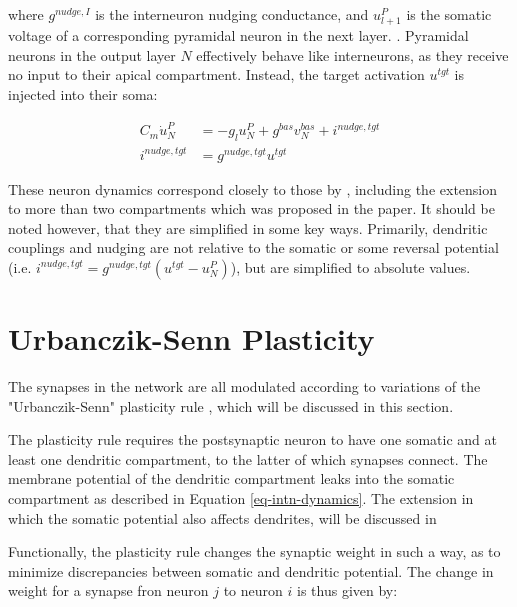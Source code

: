 where $ g^{nudge, I}$ is the interneuron nudging conductance, and $u_{l+1}^P$ is the somatic voltage of a corresponding
pyramidal neuron in the next layer. . Pyramidal neurons
in the output layer $N$ effectively behave like interneurons, as they receive no input to their apical compartment. Instead,
the target  activation $u^{tgt}$ is injected into their soma:

\begin{align}
  C_m \dot{u}_N^P & = - g_l u_N^{P} + g^{bas} v_N^{bas} + i^{nudge, tgt} \\
  i^{nudge, tgt}  & = g^{nudge, tgt} u^{tgt}
\end{align}


These neuron dynamics correspond closely to those by \cite{urbanczik2014learning}, including
the extension to more than two compartments which was proposed in the paper. It should be noted however, that they are
simplified in some key ways. Primarily, dendritic couplings and nudging are not relative to the somatic or some reversal potential
(i.e. $i^{nudge, tgt}= g^{nudge, tgt} (u^{tgt} - u_N^P )$),
but are simplified to absolute values. 








\section{Urbanczik-Senn Plasticity}\label{sec-urb-senn-plast}

The synapses in the network are all modulated according to variations of the "Urbanczik-Senn" plasticity rule \citep{urbanczik2014learning},
which will be discussed in this section. 

The plasticity rule requires the postsynaptic neuron to have one somatic and at least one dendritic compartment, to
the latter of which synapses connect. The membrane potential of the dendritic compartment leaks into the somatic 
compartment as described in Equation \ref{eq-intn-dynamics}. The extension 
in which the somatic potential also affects dendrites, will be discussed in 



Functionally, the plasticity rule 
changes the synaptic weight in such a way, as
to minimize discrepancies between somatic and dendritic potential. The change in weight for a synapse fron neuron 
$j$ to neuron $i$ is thus given by:

